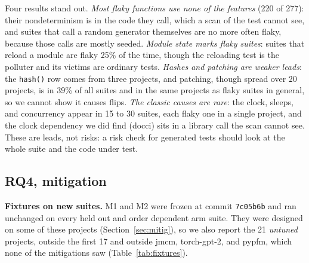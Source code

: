 Four results stand out. \emph{Most flaky functions use none of the features} (220 of 277): their nondeterminism is in the code they call, which a scan of the test cannot see, and suites that call a random generator themselves are no more often flaky, because those calls are mostly seeded. \emph{Module state marks flaky suites}: suites that reload a module are flaky 25\% of the time, though the reloading test is the polluter and its victims are ordinary tests. \emph{Hashes and patching are weaker leads}: the \texttt{hash()} row comes from three projects, and patching, though spread over 20 projects, is in 39\% of all suites and in the same projects as flaky suites in general, so we cannot show it causes flips. \emph{The classic causes are rare}: the clock, sleeps, and concurrency appear in 15 to 30 suites, each flaky one in a single project, and the clock dependency we did find (docci) sits in a library call the scan cannot see. These are leads, not risks: a risk check for generated tests should look at the whole suite and the code under test.

\subsection{RQ4, mitigation}
\label{sec:rq4}
\textbf{Fixtures on new suites.} M1 and M2 were frozen at commit \texttt{7c05b6b} and ran unchanged on every held out and order dependent arm suite. They were designed on some of these projects (Section~\ref{sec:mitig}), so we also report the 21 \emph{untuned} projects, outside the first 17 and outside jmcm, torch-gpt-2, and pypfm, which none of the mitigations saw (Table~\ref{tab:fixtures}).

